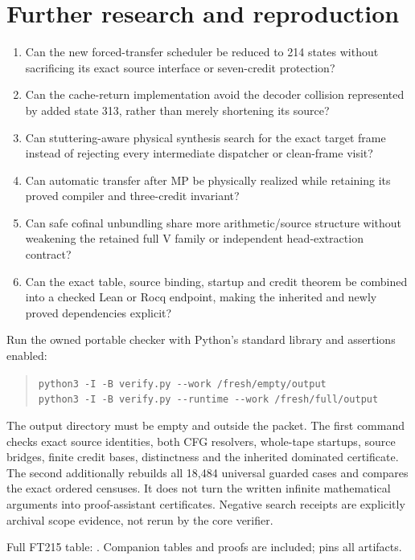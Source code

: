 \documentclass[11pt]{article}
\newcommand{\file}[1]{{\small\path{#1}}}
\begin{document}
\section{Further research and reproduction}
\begin{enumerate}
\item Can the new forced-transfer scheduler be reduced to 214 states without sacrificing its exact source interface or seven-credit protection?
\item Can the cache-return implementation avoid the decoder collision represented by added state 313, rather than merely shortening its source?
\item Can stuttering-aware physical synthesis search for the exact target frame instead of rejecting every intermediate dispatcher or clean-frame visit?
\item Can automatic transfer after MP be physically realized while retaining its proved compiler and three-credit invariant?
\item Can safe cofinal unbundling share more arithmetic/source structure without weakening the retained full V family or independent head-extraction contract?
\item Can the exact table, source binding, startup and credit theorem be combined into a checked Lean or Rocq endpoint, making the inherited and newly proved dependencies explicit?
\end{enumerate}
Run the owned portable checker with Python's standard library and assertions enabled:
\begin{quote}\small\ttfamily
\verb|python3 -I -B verify.py --work /fresh/empty/output|\\
\verb|python3 -I -B verify.py --runtime --work /fresh/full/output|
\end{quote}
The output directory must be empty and outside the packet. The first command checks exact source identities, both CFG resolvers, whole-tape startups, source bridges, finite credit bases, distinctness and the inherited dominated certificate. The second additionally rebuilds all 18,484 universal guarded cases and compares the exact ordered censuses. It does not turn the written infinite mathematical arguments into proof-assistant certificates. Negative search receipts are explicitly archival scope evidence, not rerun by the core verifier.

Full FT215 table: \file{forced215/machine.tm}. Companion tables and proofs are included; \file{MANIFEST.json} pins all artifacts.
\end{document}
